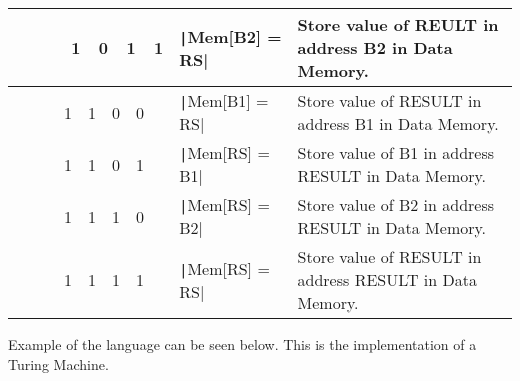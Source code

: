 \documentclass[12pt,journal,compsoc]{article}
\begin{document}
\begin{center}
{\begin{tabular}{ | p{5.5cm} | p{5.0cm} | m{12.0cm} | }
  ~~~~~~1~~0~~1~~1 & \texttt|Mem[B2] = RS| & Store value of REULT in address B2 in Data Memory. \\
  \hline
  ~~~~~~1~~1~~0~~0 & \texttt|Mem[B1] = RS| & Store value of RESULT in address B1 in Data Memory. \\
  \hline
  ~~~~~~1~~1~~0~~1 & \texttt|Mem[RS] = B1| & Store value of B1 in address RESULT in Data Memory. \\
  \hline
  ~~~~~~1~~1~~1~~0 & \texttt|Mem[RS] = B2| & Store value of B2 in address RESULT in Data Memory. \\
  \hline
  ~~~~~~1~~1~~1~~1 & \texttt|Mem[RS] = RS| & Store value of RESULT in address RESULT in Data Memory. \\
  \hline
\end{tabular} 
}

\end{center}

\clearpage
Example of the language can be seen below. This is the implementation of a Turing Machine.

\inputminted{python}{.docfiles/turingMachine.hal}
\end{document}
